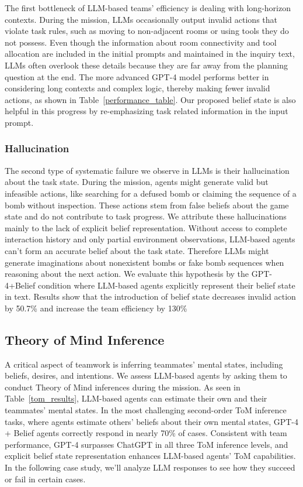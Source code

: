 \documentclass[11pt]{article}
\begin{document}
The first bottleneck of LLM-based teams' efficiency is dealing with long-horizon contexts. During the mission, LLMs occasionally output invalid actions that violate task rules, such as moving to non-adjacent rooms or using tools they do not possess. Even though the information about room connectivity and tool allocation are included in the initial prompts and maintained in the inquiry text, LLMs often overlook these details because they are far away from the planning question at the end. The more advanced GPT-4 model performs better in considering long contexts and complex logic, thereby making fewer invalid actions, as shown in Table~\ref{performance_table}. Our proposed belief state is also helpful in this progress by re-emphasizing task related information in the input prompt.



\subsubsection{Hallucination}



The second type of systematic failure we observe in LLMs is their hallucination about the task state. During the mission, agents might generate valid but infeasible actions, like searching for a defused bomb or claiming the sequence of a bomb without inspection. These actions stem from false beliefs about the game state and do not contribute to task progress. We attribute these hallucinations mainly to the lack of explicit belief representation. Without access to complete interaction history and only partial environment observations, LLM-based agents can't form an accurate belief about the task state. Therefore LLMs might generate imaginations about nonexistent bombs or fake bomb sequences when reasoning about the next action. We evaluate this hypothesis by the GPT-4+Belief condition where LLM-based agents explicitly represent their belief state in text. Results show that the introduction of belief state decreases invalid action by 50.7\% and increase the team efficiency by 130\%



\subsection{Theory of Mind Inference}


A critical aspect of teamwork is inferring teammates' mental states, including beliefs, desires, and intentions. We assess LLM-based agents by asking them to conduct Theory of Mind inferences during the mission. As seen in Table~\ref{tom_results}, LLM-based agents can estimate their own and their teammates' mental states. In the most challenging second-order ToM inference tasks, where agents estimate others' beliefs about their own mental states, GPT-4 + Belief agents correctly respond in nearly 70\% of cases. Consistent with team performance, GPT-4 surpasses ChatGPT in all three ToM inference levels, and explicit belief state representation enhances LLM-based agents' ToM capabilities. In the following case study, we'll analyze LLM responses to see how they succeed or fail in certain cases.
\end{document}
